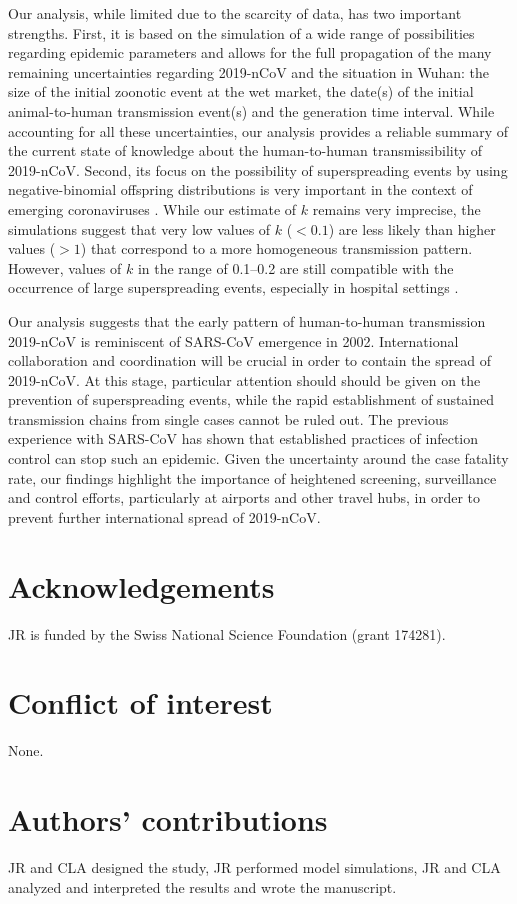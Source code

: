 \documentclass{article}
\begin{document}
Our analysis, while limited due to the scarcity of data, has two important strengths.
First, it is based on the simulation of a wide range of possibilities regarding epidemic parameters and allows for the full propagation of the many remaining uncertainties regarding 2019-nCoV and the situation in Wuhan: the size of the initial zoonotic event at the wet market, the date(s) of the initial animal-to-human transmission event(s) and the generation time interval.
While accounting for all these uncertainties, our analysis provides a reliable summary of the current state of knowledge about the human-to-human transmissibility of 2019-nCoV.
Second, its focus on the possibility of superspreading events by using negative-binomial offspring distributions is very important in the context of emerging coronaviruses \cite{Lloyd-Smith:2005,Althaus:2015b}.
While our estimate of $k$ remains very imprecise, the simulations suggest that very low values of $k$ ($< 0.1$) are less likely than higher values ($> 1$) that correspond to a more homogeneous transmission pattern.
However, values of $k$ in the range of 0.1--0.2 are still compatible with the occurrence of large superspreading events, especially in hospital settings \cite{oh2015middle,assiri2013hospital}.

Our analysis suggests that the early pattern of human-to-human transmission 2019-nCoV is reminiscent of SARS-CoV emergence in 2002.
International collaboration and coordination will be crucial in order to contain the spread of 2019-nCoV.
At this stage, particular attention should should be given on the prevention of superspreading events, while the rapid establishment of sustained transmission chains from single cases cannot be ruled out.
The previous experience with SARS-CoV has shown that established practices of infection control can stop such an epidemic.
Given the uncertainty around the case fatality rate, our findings highlight the importance of heightened screening, surveillance and control efforts, particularly at airports and other travel hubs, in order to prevent further international spread of 2019-nCoV.



\section*{Acknowledgements}
JR is funded by the Swiss National Science Foundation (grant 174281).
\section*{Conflict of interest}
None.

\section*{Authors' contributions}

JR and CLA designed the study, JR performed model simulations, JR and CLA analyzed and interpreted the results and wrote the manuscript.


  
\end{document}
